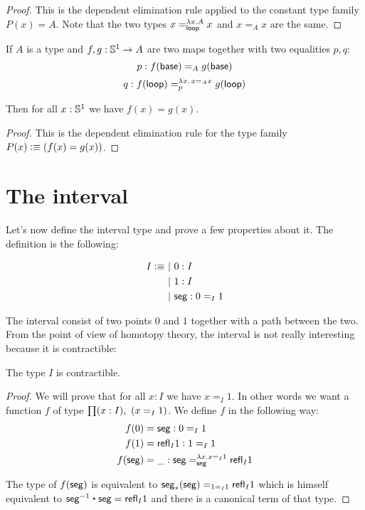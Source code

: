 \begin{proof}
  This is the dependent elimination rule applied to the constant type family
  $P(x)=A$. Note that the two types $x=^{\lambda{}x.A}_\lloop{}x$ and $x=_Ax$
  are the same.
\end{proof}

\begin{lem}
  If $A$ is a type and $f,g:\Sn^1\to{}A$ are two maps together with two
  equalities $p,q$:
  \[p:f(\base)=_Ag(\base)\]
  \[q:\map{f}\lloop=^{\lambda{}x.\,x=_Ax}_p\map{g}\lloop\]

  Then for all $x:\Sn^1$ we have $f(x)=g(x)$.
\end{lem}

\begin{proof}
  This is the dependent elimination rule for the type family
  $P(x)\defeq(f(x)=g(x))$.
\end{proof}

\section{The interval}
\label{sec:interval}

Let’s now define the interval type and prove a few properties about it. The
definition is the following:

\begin{align*}
  I \defeq&\ |\ 0:I\\
  &\ |\ 1:I \\
  &\ |\ \seg:\id[I]01
\end{align*}

The interval consist of two points $0$ and $1$ together with a path between the
two. From the point of view of homotopy theory, the interval is not really
interesting because it is contractible:

\begin{lem}
  The type $I$ is contractible.
\end{lem}

\begin{proof}
  We will prove that for all $x:I$ we have $x=_I1$. In other words we want a
  function $f$ of type $\prd{x:I}(x=_I1)$. We define $f$ in the following way:
  \begin{align*}
    f(0)&=\seg:0=_I1\\
    f(1)&=\refl{I}1:1=_I1\\
    \map{f}\seg&=\_:\seg=_\seg^{\lambda{}x.x=_I1}\refl{I}1
  \end{align*}

  The type of $\map{f}\seg$ is equivalent to $\trans\seg\seg=_{1=_I1}\refl{I}1$
  which is himself equivalent to $\rev\seg\ct\seg=\refl{I}1$ and there is a
  canonical term of that type.
\end{proof}

